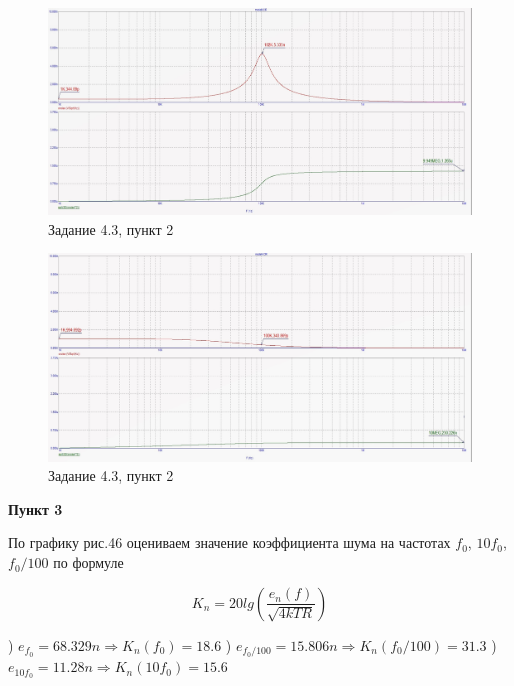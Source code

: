 \documentclass[a4paper, 14pt]{extarticle}%
\begin{document}
\begin{figure}[h!]
			\centering
			\includegraphics[width=1.1\linewidth]{4/4_3_4.jpg}
			\caption{Задание 4.3, пункт 2}
			\label{A}
\end{figure}

\begin{figure}[h!]
			\centering
			\includegraphics[width=1.1\linewidth]{4/4_3_5.jpg}
			\caption{Задание 4.3, пункт 2}
			\label{A}
\end{figure}


\textbf{Пункт 3}
\newline

По графику рис.46 оцениваем значение коэффициента шума на частотах $f_0$, $10f_0$, $f_0/100$ по формуле
\newline

\[  K_n = 20lg(\frac{e_n(f)}{\sqrt{4kTR}})   \]

) $e_{f_0}= 68.329n \Rightarrow  K_n(f_0) = 18.6 $
) $e_{f_0/100}= 15.806n \Rightarrow K_n(f_0/100) = 31.3$
) $e_{10f_0}= 11.28n \Rightarrow  K_n(10f_0) = 15.6$
\newline
\end{document}
